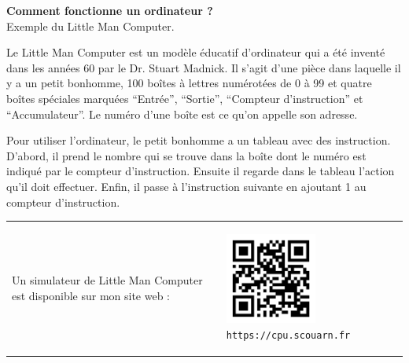 \documentclass[12pt]{article}
\begin{document}
\sffamily

\begin{center}
    \LARGE\textbf{Comment fonctionne un ordinateur ?} \\
    \large Exemple du Little Man Computer. \\
\end{center}

\normalsize
Le Little Man Computer est un modèle éducatif d'ordinateur qui a été inventé dans les années 60 par le Dr. Stuart Madnick.
Il s'agit d'une pièce dans laquelle il y a un petit bonhomme, 100 boîtes à lettres
numérotées de 0 à 99 et quatre boîtes spéciales marquées \enquote{Entrée}, \enquote{Sortie}, \enquote{Compteur d'instruction} et \enquote{Accumulateur}.
Le numéro d'une boîte est ce qu'on appelle son adresse.
\par
Pour utiliser l'ordinateur, le petit bonhomme a un tableau avec des instruction.
D'abord, il prend le nombre qui se trouve dans la boîte dont le numéro est indiqué par le compteur d'instruction.
Ensuite il regarde dans le tableau l'action qu'il doit effectuer.
Enfin, il passe à l'instruction suivante en ajoutant 1 au compteur d'instruction.

\begin{center}
\begin{tabular}{m{7cm} m{5cm}}
    Un simulateur de Little Man Computer est disponible sur mon site web :
& 
    \begin{center}
    \includegraphics[width=3.0cm]{figures/qrcode.png}
    \texttt{https://cpu.scouarn.fr}
    \end{center}
\end{tabular}
\end{center}
\end{document}

